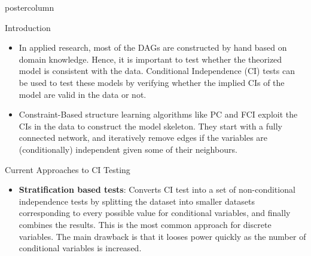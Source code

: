 \documentclass{beamer}
\def\ci{\perp\!\!\!\!\!\perp}
\begin{document}
\begin{frame}
\begin{columns}
\begin{column}{.33\textwidth}
\begin{beamercolorbox}[center]{postercolumn}
\begin{minipage}{.98\textwidth}
{\begin{myblock}{Introduction}
	\begin{itemize}
		\item In applied research, most of the DAGs are constructed by
			hand based on domain knowledge. Hence, it is important
			to test whether the theorized model is consistent with
			the data. Conditional Independence (CI) tests can be
			used to test these models by verifying whether the
			implied CIs of the model are valid in the data or not.
		\item Constraint-Based structure learning algorithms like PC and FCI exploit
			the CIs in the data to construct the model skeleton. They start with
			a fully connected network, and iteratively remove edges if the variables 
			are (conditionally) independent given some of their neighbours.
	\end{itemize}

					\end{myblock}\vfill
					\begin{myblock}{Current Approaches to CI Testing}
						\begin{itemize}
							\item \textbf{Stratification based tests}: Converts CI
								test into a set of non-conditional independence tests
								by splitting the dataset into smaller datasets corresponding to
								every possible value for conditional variables, and finally combines 
								the results. This is the most common approach for discrete variables. 
								The main drawback is that it looses power quickly as the number of conditional variables
								is increased.


\end{itemize}
\end{myblock}}
\end{minipage}
\end{beamercolorbox}
\end{column}
\end{columns}
\end{frame}
\end{document}
